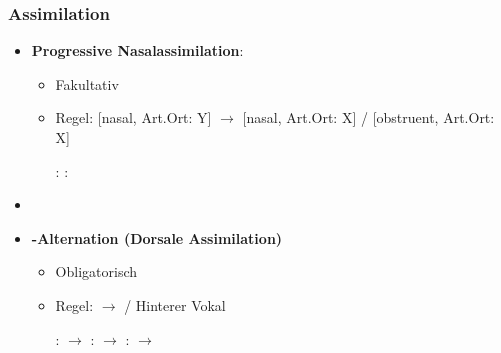 
\begin{frame}
\frametitle{Assimilation}

\begin{itemize}
	\item \textbf{Progressive Nasalassimilation}:

	\begin{itemize}
		\item Fakultativ
		\item Regel: [nasal, Art.Ort: Y] $\rightarrow$ [nasal, Art.Ort: X] /  [obstruent, Art.Ort: X] \underline{\quad} 

	\eal
		\ex {}:  \ras 
		\textipa{[ha:k\textsyllabic{n}]} \ras \textipa{[ha:k\textsyllabic{N}]}
		\ex {}:  \ras 
		\textipa{[SU\.p\textsyllabic{n}]} \ras \textipa{[SU\.p\textsyllabic{m}]}
	\zl
	
	\end{itemize}

	\item[]
	\item \textbf{\textipa{[\c{c}]/[x]}-Alternation (Dorsale Assimilation)}

	\begin{itemize}
		\item Obligatorisch
		\item Regel:  $\rightarrow$ \textipa{[x]} / Hinterer Vokal \underline{\quad}

	\eal
		\ex {}:  $\rightarrow$ \textipa{[mI\c{c}]}
		\ex {}:  $\rightarrow$ \textipa{[bu:x]}
		\ex {}:  $\rightarrow$ \textipa{[PEl\c{c}]}
	\zl
	
	\end{itemize}		

\end{itemize}

\end{frame}




